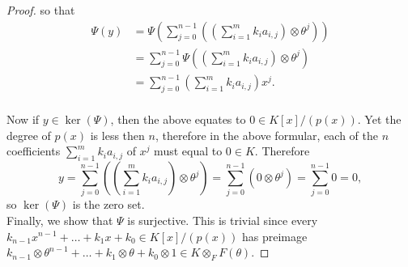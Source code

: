 \documentclass{article}
\begin{document}
\begin{proof}
    so that
    \begin{align*}
      \Psi(y) &=\Psi\left( \sum_{j=0}^{n-1} \left(\left(\sum_{i=1}^m
        k_ia_{i,j}\right) \otimes \theta^j \right)\right)\\
      &=\sum_{j=0}^{n-1} \Psi \left(\left(\sum_{i=1}^m
        k_ia_{i,j}\right) \otimes \theta^j \right)\\
      &=\sum_{j=0}^{n-1} \left(\sum_{i=1}^m k_i a_{i,j}\right) x^j.\\
    \end{align*}

    Now if $y\in\ker(\Psi)$, then the above equates to $0\in K[x]/(p(x))$.
    Yet the degree of $p(x)$ is less then $n$, therefore in the above
    formular, each of the $n$ coefficients $\sum_{i=1}^m k_i a_{i,j}$ of
    $x^j$ must equal to $0\in K$. Therefore
    \[y =\sum_{j=0}^{n-1} \left(\left(\sum_{i=1}^m k_ia_{i,j}\right)
        \otimes \theta^j \right)
      =\sum_{j=0}^{n-1} \left(0 \otimes \theta^j \right)
      =\sum_{j=0}^{n-1} 0 =0,\]
    so $\ker(\Psi)$ is the zero set. \\

    Finally, we show that $\Psi$ is surjective. This is trivial since every
    $k_{n-1}x^{n-1}+\ldots+k_1x+k_0 \in K[x]/(p(x))$ has preimage
    $k_{n-1}\otimes \theta^{n-1}+\ldots+k_1\otimes \theta+k_0\otimes 1 \in
    K\otimes_F F(\theta)$.
  \end{proof}
\end{document}
